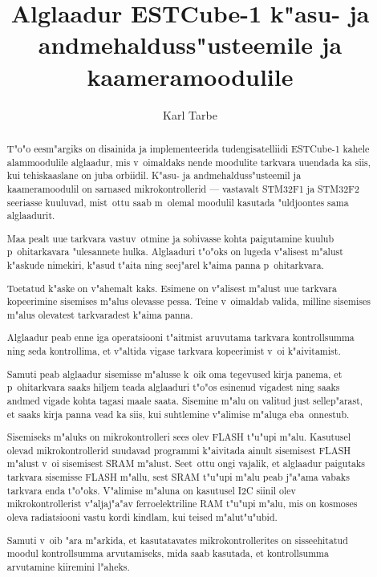 \documentclass[12pt,a4paper]{article}
\begin{document}
\title{Alglaadur ESTCube-1 k"asu- ja andmehalduss"usteemile ja kaameramoodulile}
\author{Karl Tarbe}
\maketitle

\begin{abstract}
T"o"o eesm"argiks on disainida ja implementeerida tudengisatelliidi
ESTCube-1 kahele alammoodulile alglaadur, mis v~oimaldaks nende
moodulite tarkvara uuendada ka siis, kui tehiskaaslane on juba orbiidil.
K"asu- ja andmehalduss"usteemil ja kaameramoodulil on sarnased
mikrokontrollerid --- vastavalt STM32F1 ja STM32F2 seeriasse kuuluvad,
mist~ottu saab m~olemal moodulil kasutada "uldjoontes sama
alglaadurit. 

Maa pealt uue tarkvara vastuv~otmine ja sobivasse kohta paigutamine
kuulub p~ohitarkavara "ulesannete hulka. Alglaaduri t"o"oks on lugeda
v"alisest m"alust k"askude nimekiri, k"asud t"aita ning
seej"arel k"aima panna p~ohitarkvara. 

Toetatud k"aske on v"ahemalt kaks. Esimene on v"alisest m"alust uue tarkvara
kopeerimine sisemises m"alus olevasse pessa. Teine v~oimaldab valida,
milline sisemises m"alus olevatest tarkvaradest k"aima panna. 

Alglaadur peab enne iga operatsiooni t"aitmist aruvutama tarkvara
kontrollsumma ning seda kontrollima, et v"altida vigase tarkvara
kopeerimist v~oi k"aivitamist.

Samuti peab alglaadur sisemisse m"alusse k~oik oma
tegevused kirja panema, et p~ohitarkvara saaks hiljem teada alglaaduri
t"o"os esinenud vigadest ning saaks andmed vigade kohta tagasi maale
saata. Sisemine m"alu on valitud just sellep"arast, et saaks kirja panna
vead ka siis, kui suhtlemine v"alimise m"aluga eba~onnestub.

Sisemiseks m"aluks on mikrokontrolleri sees olev FLASH t"u"upi m"alu.
Kasutusel olevad mikrokontrollerid suudavad programmi k"aivitada ainult
sisemisest FLASH m"alust v~oi sisemisest SRAM m"alust. Seet~ottu ongi vajalik, et
alglaadur paigutaks tarkvara sisemisse FLASH m"allu, sest SRAM t"u"upi
m"alu peab j"a"ama vabaks tarkvara enda t"o"oks. V"alimise m"aluna
on kasutusel I2C siinil olev mikrokontrollerist v"aljaj"a"av
ferroelektriline RAM t"u"upi m"alu, mis on kosmoses oleva
radiatsiooni vastu kordi kindlam, kui teised m"alut"u"ubid.

Samuti v~oib "ara m"arkida, et kasutatavates mikrokontrollerites on sisseehitatud
moodul kontrollsumma arvutamiseks, mida saab kasutada, et kontrollsumma
arvutamine kiiremini l"aheks.
\end{abstract}
\end{document}
